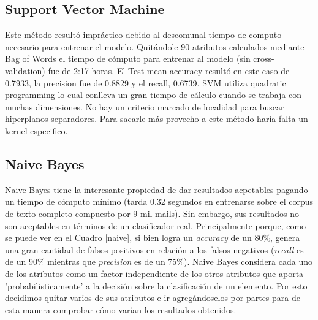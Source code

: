 \documentclass[10pt,a4paper]{article}
\begin{document}
\subsection{Support Vector Machine}

Este método resultó impráctico debido al descomunal tiempo de computo necesario para entrenar el modelo. Quitándole 90 atributos calculados mediante Bag of Words el tiempo de cómputo para entrenar al modelo (sin cross-validation) fue de 2:17 horas. El Test mean accuracy resultó en este caso de 0.7933, la precision fue de 0.8829 y el recall, 0.6739. SVM utiliza quadratic programming lo cual conlleva un gran tiempo de cálculo cuando se trabaja con muchas dimensiones. No hay un criterio marcado de localidad para buscar hiperplanos separadores. Para sacarle más provecho a este método haría falta un kernel especifico.

\subsection{Naive Bayes}

Naive Bayes tiene la interesante propiedad de dar resultados acpetables pagando un tiempo de cómputo mínimo (tarda 0.32 segundos en entrenarse sobre el corpus de texto completo compuesto por 9 mil mails). Sin embargo, sus resultados no son aceptables en términos de un clasificador real. Principalmente porque, como se puede ver en el Cuadro \ref{naive}, si bien logra un \textit{accuracy} de un 80\%, genera una gran cantidad de falsos positivos en relación a los falsos negativos (\textit{recall} es de un 90\% mientras que \textit{precision} es de un 75\%). Naive Bayes considera cada uno de los atributos como un factor independiente de los otros atributos que aporta 'probabilisticamente' a la decisión sobre la clasificación de un elemento. Por esto decidimos quitar varios de sus atributos e ir agregándoselos por partes para de esta manera comprobar cómo varían los resultados obtenidos.
\end{document}
